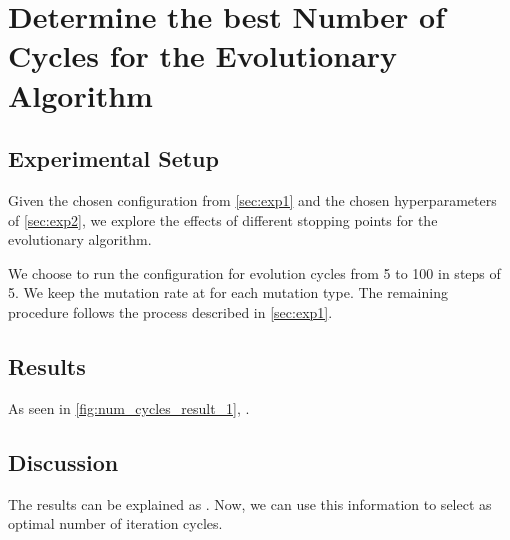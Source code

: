 \documentclass[./../../paper.tex]{subfiles}
\begin{document}
\section{Determine the best Number of Cycles for the Evolutionary Algorithm }

\subsection{Experimental Setup}
\label{sec:exp3}
Given the chosen configuration from \autoref{sec:exp1} and the chosen hyperparameters of \autoref{sec:exp2}, we explore the effects of different stopping points for the evolutionary algorithm. 

We choose to run the configuration for evolution cycles from 5 to 100 in steps of 5. We keep the mutation rate at  for each mutation type. The remaining procedure follows the process described in \autoref{sec:exp1}.

\subsection{Results}




As seen in \autoref{fig:num_cycles_result_1}, .

\subsection{Discussion}
The results can be explained as . Now, we can use this information to select  as optimal number of iteration cycles. 
\end{document}
